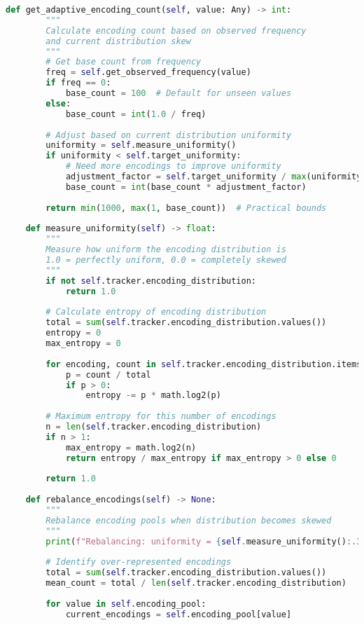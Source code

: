 \begin{lstlisting}[language=Python, caption={Adaptive encoding based on frequency}]
    def get_adaptive_encoding_count(self, value: Any) -> int:
        """
        Calculate encoding count based on observed frequency
        and current distribution skew
        """
        # Get base count from frequency
        freq = self.get_observed_frequency(value)
        if freq == 0:
            base_count = 100  # Default for unseen values
        else:
            base_count = int(1.0 / freq)
        
        # Adjust based on current distribution uniformity
        uniformity = self.measure_uniformity()
        if uniformity < self.target_uniformity:
            # Need more encodings to improve uniformity
            adjustment_factor = self.target_uniformity / max(uniformity, 0.1)
            base_count = int(base_count * adjustment_factor)
        
        return min(1000, max(1, base_count))  # Practical bounds
    
    def measure_uniformity(self) -> float:
        """
        Measure how uniform the encoding distribution is
        1.0 = perfectly uniform, 0.0 = completely skewed
        """
        if not self.tracker.encoding_distribution:
            return 1.0
        
        # Calculate entropy of encoding distribution
        total = sum(self.tracker.encoding_distribution.values())
        entropy = 0
        max_entropy = 0
        
        for encoding, count in self.tracker.encoding_distribution.items():
            p = count / total
            if p > 0:
                entropy -= p * math.log2(p)
        
        # Maximum entropy for this number of encodings
        n = len(self.tracker.encoding_distribution)
        if n > 1:
            max_entropy = math.log2(n)
            return entropy / max_entropy if max_entropy > 0 else 0
        
        return 1.0
    
    def rebalance_encodings(self) -> None:
        """
        Rebalance encoding pools when distribution becomes skewed
        """
        print(f"Rebalancing: uniformity = {self.measure_uniformity():.3f}")
        
        # Identify over-represented encodings
        total = sum(self.tracker.encoding_distribution.values())
        mean_count = total / len(self.tracker.encoding_distribution)
        
        for value in self.encoding_pool:
            current_encodings = self.encoding_pool[value]
            

\end{lstlisting}
